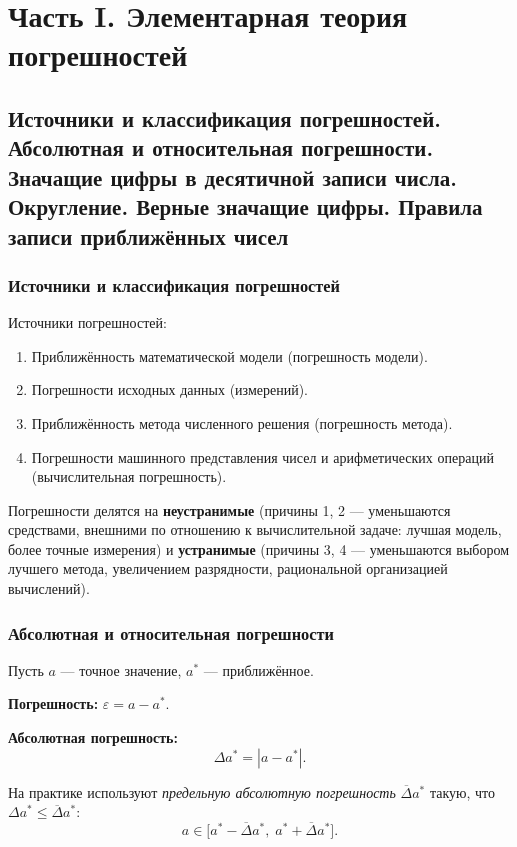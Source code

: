 \section{Часть I. Элементарная теория погрешностей}

\subsection{Источники и классификация погрешностей. Абсолютная и относительная погрешности. Значащие цифры в десятичной записи числа. Округление. Верные значащие цифры. Правила записи приближённых чисел}

\subsubsection*{Источники и классификация погрешностей}

Источники погрешностей:
\begin{enumerate}
    \item Приближённость математической модели (погрешность модели).
    \item Погрешности исходных данных (измерений).
    \item Приближённость метода численного решения (погрешность метода).
    \item Погрешности машинного представления чисел и арифметических операций (вычислительная погрешность).
\end{enumerate}

Погрешности делятся на \textbf{неустранимые} (причины 1, 2 --- уменьшаются средствами, внешними по отношению к вычислительной задаче: лучшая модель, более точные измерения) и \textbf{устранимые} (причины 3, 4 --- уменьшаются выбором лучшего метода, увеличением разрядности, рациональной организацией вычислений).

\subsubsection*{Абсолютная и относительная погрешности}

Пусть $a$ --- точное значение, $a^*$ --- приближённое.

\textbf{Погрешность:} $\varepsilon = a - a^*$.

\textbf{Абсолютная погрешность:}
\[
    \Delta a^* = |a - a^*|.
\]

На практике используют \textit{предельную абсолютную погрешность} $\overline{\Delta} a^*$ такую, что $\Delta a^* \leq \overline{\Delta} a^*$:
\[
    a \in \bigl[a^* - \overline{\Delta} a^*,\; a^* + \overline{\Delta} a^*\bigr].
\]

